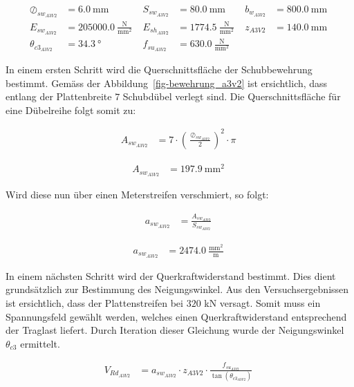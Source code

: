 \documentclass[
  11pt,
  letterpaper,
]{scrreprt}
\begin{document}
$$
\begin{aligned}
\oslash_{sw_{A3V2}} &= 6.0\ \mathrm{mm} \; 
 &S_{sw_{A3V2}} &= 80.0\ \mathrm{mm} \; 
 &b_{w_{A3V2}} &= 800.0\ \mathrm{mm} \; 
\\[12pt]
 E_{sw_{A3V2}} &= 205000.0\ \frac{\mathrm{N}}{\mathrm{mm}^{2}} \; 
 &E_{sh_{A3V2}} &= 1774.5\ \frac{\mathrm{N}}{\mathrm{mm}^{2}} \; 
 &z_{A3V2} &= 140.0\ \mathrm{mm} \; 
\\[12pt]
 \theta_{c3_{A3V2}} &= 34.3\ \mathrm{°} \; 
 &f_{su_{A3V2}} &= 630.0\ \frac{\mathrm{N}}{\mathrm{mm}^{2}} \;
\end{aligned}
$$

In einem ersten Schritt wird die Querschnittsfläche der Schubbewehrung
bestimmt. Gemäss der Abbildung~\ref{fig-bewehrung_a3v2} ist ersichtlich,
dass entlang der Plattenbreite \(7\) Schubdübel verlegt sind. Die
Querschnittsfläche für eine Dübelreihe folgt somit zu:

$$
\begin{aligned}
A_{sw_{A3V2}} &= 7 \cdot \left( \frac{ \oslash_{sw_{A3V2}} }{ 2 } \right) ^{ 2 } \cdot \pi \; 
\end{aligned}
$$

$$
\begin{aligned}
A_{sw_{A3V2}} &= 197.9\ \mathrm{mm}^{2} \;
\end{aligned}
$$

Wird diese nun über einen Meterstreifen verschmiert, so folgt:

$$
\begin{aligned}
a_{sw_{A3V2}} &= \frac{ A_{sw_{A3V2}} }{ S_{sw_{A3V2}} } \; 
\end{aligned}
$$

$$
\begin{aligned}
a_{sw_{A3V2}} &= 2474.0\ \frac{\mathrm{mm}^{2}}{\mathrm{m}} \;
\end{aligned}
$$

In einem nächsten Schritt wird der Querkraftwiderstand bestimmt. Dies
dient grundsätzlich zur Bestimmung des Neigungswinkel. Aus den
Versuchsergebnissen ist ersichtlich, dass der Plattenstreifen bei
\(320\) kN versagt. Somit muss ein Spannungsfeld gewählt werden, welches
einen Querkraftwiderstand entsprechend der Traglast liefert. Durch
Iteration dieser Gleichung wurde der Neigungswinkel \(\theta_{c3}\)
ermittelt.

$$
\begin{aligned}
V_{Rd_{A3V2}} &= a_{sw_{A3V2}} \cdot z_{A3V2} \cdot \frac{ f_{su_{A3V2}} }{ \tan \left( \theta_{c3_{A3V2}} \right) } \; 
\end{aligned}
$$
\end{document}
